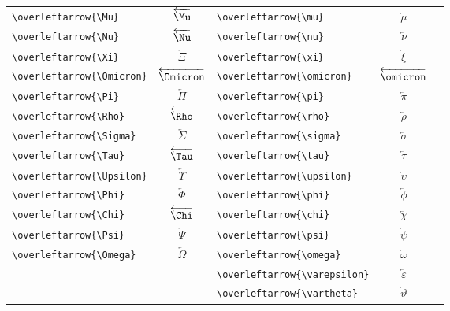 \documentclass[12pt,a4paper]{article}
\begin{document}
\begin{longtable}{|l|c|l|c|c|}
\verb|\overleftarrow{\Mu}|         & $\overleftarrow{\Mu}$         & \verb|\overleftarrow{\mu}|         & $\overleftarrow{\mu}$         & \\
\verb|\overleftarrow{\Nu}|         & $\overleftarrow{\Nu}$         & \verb|\overleftarrow{\nu}|         & $\overleftarrow{\nu}$         & \\
\verb|\overleftarrow{\Xi}|         & $\overleftarrow{\Xi}$         & \verb|\overleftarrow{\xi}|         & $\overleftarrow{\xi}$         & \\
\verb|\overleftarrow{\Omicron}|    & $\overleftarrow{\Omicron}$    & \verb|\overleftarrow{\omicron}|    & $\overleftarrow{\omicron}$    & \\
\verb|\overleftarrow{\Pi}|         & $\overleftarrow{\Pi}$         & \verb|\overleftarrow{\pi}|         & $\overleftarrow{\pi}$         & \\
\verb|\overleftarrow{\Rho}|        & $\overleftarrow{\Rho}$        & \verb|\overleftarrow{\rho}|        & $\overleftarrow{\rho}$        & \\
\verb|\overleftarrow{\Sigma}|      & $\overleftarrow{\Sigma}$      & \verb|\overleftarrow{\sigma}|      & $\overleftarrow{\sigma}$      & \\
\verb|\overleftarrow{\Tau}|        & $\overleftarrow{\Tau}$        & \verb|\overleftarrow{\tau}|        & $\overleftarrow{\tau}$        & \\
\verb|\overleftarrow{\Upsilon}|    & $\overleftarrow{\Upsilon}$    & \verb|\overleftarrow{\upsilon}|    & $\overleftarrow{\upsilon}$    & \\
\verb|\overleftarrow{\Phi}|        & $\overleftarrow{\Phi}$        & \verb|\overleftarrow{\phi}|        & $\overleftarrow{\phi}$        & \\
\verb|\overleftarrow{\Chi}|        & $\overleftarrow{\Chi}$        & \verb|\overleftarrow{\chi}|        & $\overleftarrow{\chi}$        & \\
\verb|\overleftarrow{\Psi}|        & $\overleftarrow{\Psi}$        & \verb|\overleftarrow{\psi}|        & $\overleftarrow{\psi}$        & \\
\verb|\overleftarrow{\Omega}|      & $\overleftarrow{\Omega}$      & \verb|\overleftarrow{\omega}|      & $\overleftarrow{\omega}$      & \\
                                   &                               & \verb|\overleftarrow{\varepsilon}| & $\overleftarrow{\varepsilon}$ & \\
                                   &                               & \verb|\overleftarrow{\vartheta}|   & $\overleftarrow{\vartheta}$   & \\

\end{longtable}
\end{document}
